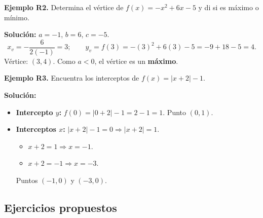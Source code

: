 \documentclass[12pt, letterpaper]{article}
\begin{document}
\textbf{Ejemplo R2.} Determina el vértice de $f(x) = -x^2 + 6x - 5$ y di si es máximo o mínimo.

\begin{cuadrosolucion}
  \textbf{Solución:} $a = -1$, $b = 6$, $c = -5$.
  $$x_v = -\frac{6}{2(-1)} = 3; \qquad y_v = f(3) = -(3)^2 + 6(3) - 5 = -9 + 18 - 5 = 4.$$
  Vértice: $(3, 4)$. Como $a < 0$, el vértice es un \textbf{máximo}.
\end{cuadrosolucion}

\textbf{Ejemplo R3.} Encuentra los interceptos de $f(x) = |x + 2| - 1$.

\begin{cuadrosolucion}
  \textbf{Solución:}
  \begin{itemize}
    \item \textbf{Intercepto $y$:} $f(0) = |0 + 2| - 1 = 2 - 1 = 1$. Punto $(0, 1)$.
    \item \textbf{Interceptos $x$:} $|x + 2| - 1 = 0 \Rightarrow |x + 2| = 1$.
          \begin{itemize}
            \item $x + 2 = 1 \Rightarrow x = -1$.
            \item $x + 2 = -1 \Rightarrow x = -3$.
          \end{itemize}
          Puntos $(-1, 0)$ y $(-3, 0)$.
  \end{itemize}
\end{cuadrosolucion}

\subsection{Ejercicios propuestos}
\end{document}
